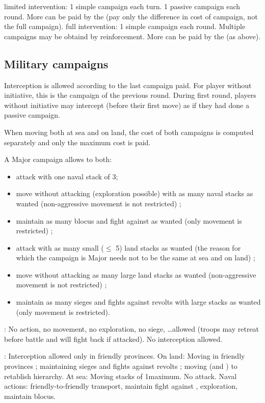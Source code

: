 \bparag limited intervention: 1 simple campaign each turn. 1 passive campaign
each round. More can be paid by the \MAJ (pay only the difference in cost of
campaign, not the full campaign).
\bparag full intervention: 1 simple campaign each round. Multiple campaigns
may be obtaind by reinforcement. More can be paid by the \MAJ (as above).


\subsection{Military campaigns}
\aparag Interception is allowed according to the last campaign paid.
\bparag For player without initiative, this is the campaign of the previous
round.
\bparag During first round, players without initiative may intercept (before
their first move) as if they had done a passive campaign.

\aparag When moving both at sea and on land, the cost of both campaigns is
computed separately and only the maximum cost is paid.
\begin{exemple}
  A Major campaign allows to both:
  \begin{itemize}
  \item attack with one naval stack of 3\FLEET ;
  \item move without attacking (exploration possible) with as many naval
    stacks as wanted (non-aggressive movement is not restricted) ;
  \item maintain as many blocus and fight against \corsaire as wanted (only
    movement is restricted) ;
  \item attack with as many small ($\leq$ 5\LD) land stacks as wanted (the
    reason for which the campaign is Major needs not to be the same at sea and
    on land) ;
  \item move without attacking as many large land stacks as wanted
    (non-aggressive movement is not restricted) ;
  \item maintain as many sieges and fights against revolts with large stacks as
    wanted (only movement is restricted).
  \end{itemize}
\end{exemple}

\ducats: No action, no movement, no exploration, no siege,
\ldots allowed (troops may retreat before battle and will fight back if
attacked). No interception allowed.

\ducats:
\bparag Interception allowed only in friendly provinces.
\bparag On land: Moving in friendly provinces ; maintaining sieges and fights
against revolts ; moving \LeaderG (and \LeaderC) to retablish hierarchy.
\bparag At sea: Moving stacks of 1\FLEET maximum. No attack.
\bparag Naval actions: friendly-to-friendly transport, maintain fight against
\corsaire, exploration, maintain blocus.

